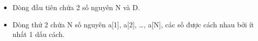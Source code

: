 \begin{itemize}
	\item     Dòng đầu tiên chứa 2 số nguyên N và D.   
	\item     Dòng thứ 2 chứa N số nguyên a[1], a[2], …, a[N], các số được cách nhau bởi ít nhất 1 dấu cách.   
\end{itemize}